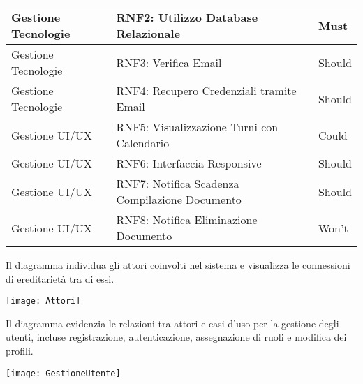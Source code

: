 \documentclass[a4paper]{report}
\begin{document}
\begin{longtable}{|p{4.5cm}|p{6.25cm}|p{2cm}|}
\hline
Gestione Tecnologie & RNF2: Utilizzo Database Relazionale & Must \\
\hline
Gestione Tecnologie & RNF3: Verifica Email & Should \\
\hline
Gestione Tecnologie & RNF4: Recupero Credenziali tramite Email & Should \\
\hline
Gestione UI/UX & RNF5: Visualizzazione Turni con Calendario & Could \\
\hline
Gestione UI/UX & RNF6: Interfaccia Responsive & Should \\
\hline
Gestione UI/UX & RNF7: Notifica Scadenza Compilazione Documento & Should \\
\hline
Gestione UI/UX & RNF8: Notifica Eliminazione Documento & Won't \\
\hline
\end{longtable}

\clearpage
{}

Il diagramma individua gli attori coinvolti nel sistema e visualizza le connessioni di ereditarietà tra di essi.

\begin{figure*}[ht]
    \centering
    \texttt{[image: Attori]}
\end{figure*}

\clearpage
{}

Il diagramma evidenzia le relazioni tra attori e casi d’uso per la gestione degli utenti, incluse registrazione, autenticazione, assegnazione di ruoli e modifica dei profili.

\begin{figure*}[ht]
    \centering
    \texttt{[image: GestioneUtente]}
\end{figure*}
\end{document}

